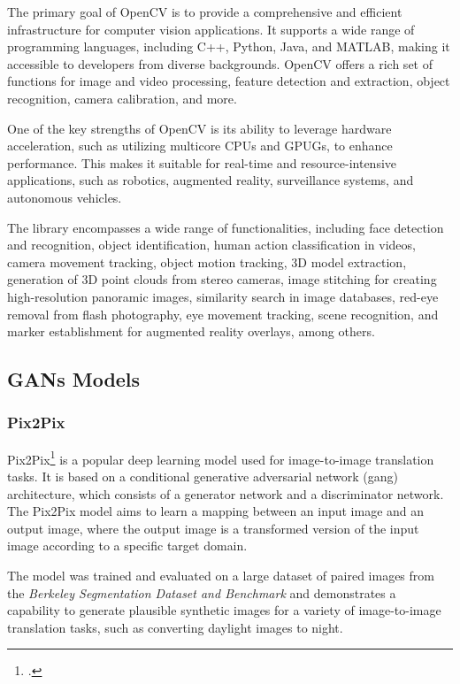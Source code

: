 The primary goal of OpenCV is to provide a comprehensive and efficient infrastructure for computer vision applications. 
It supports a wide range of programming languages, including C++, Python, Java, and MATLAB, making it accessible to developers from diverse backgrounds. 
OpenCV offers a rich set of functions for image and video processing, feature detection and extraction, object recognition, camera calibration, and more.

One of the key strengths of OpenCV is its ability to leverage hardware acceleration, such as utilizing multicore CPUs and \gls{GPUG}s, to enhance performance. 
This makes it suitable for real-time and resource-intensive applications, such as robotics, augmented reality, surveillance systems, and autonomous vehicles.

The library encompasses a wide range of functionalities, including face detection and recognition, object identification, human action classification in videos, camera movement tracking, object motion tracking, 3D model extraction, generation of 3D point clouds from stereo cameras, image stitching for creating high-resolution panoramic images, similarity search in image databases, red-eye removal from flash photography, eye movement tracking, scene recognition, and marker establishment for augmented reality overlays, among others.

\subsection{GANs Models}\label{subsec:gans-models}
\subsubsection{Pix2Pix}\label{subsubsec:pix2pix}
Pix2Pix\footcite{paper:pix2pix} is a popular deep learning model used for image-to-image translation tasks. It is based on a conditional generative adversarial network (\gls{gang}) architecture, which consists of a generator network and a discriminator network. 
The Pix2Pix model aims to learn a mapping between an input image and an output image, where the output image is a transformed version of the input image according to a specific target domain.

The model was trained and evaluated on a large dataset of paired images from the \textit{Berkeley Segmentation Dataset and Benchmark} and demonstrates a capability to generate plausible synthetic images for a variety of image-to-image translation tasks, such as converting daylight images to night.

